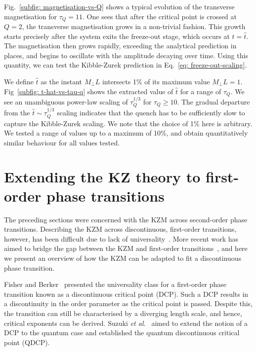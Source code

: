 Fig.~\ref{subfig: magnetisation-vs-Q} shows a typical evolution of the
transverse magnetisation for \(\tau_Q = 11\).
One sees that after the critical point is crossed at \( Q = 2 \), the transverse
magnetisation grows in a non-trivial fashion.
This growth starts precisely after the system exits the freeze-out stage, which
occurs at \(t=\hat{t}\).
The magnetisation then grows rapidly, exceeding the analytical prediction in
places, and begins to oscillate with the amplitude decaying over time.
Using this quantity, we can test the Kibble-Zurek prediction in
Eq.~\eqref{eq: freeze-out-scaling}.

We define \( \hat{t} \) as the instant \(M_\perp L\) intersects 1\% of its
maximum value \(M_\perp L = 1\).
Fig~\ref{subfig: t-hat-vs-tau-q} shows the extracted value of \( \hat{t} \) for
a range of \( \tau_Q \).
We see an unambiguous power-law scaling of \(\tau_Q^{1/3}\) for
\(\tau_Q \geq 10\).
The gradual departure from the \(\hat{t} \sim \tau_Q^{1/3}\) scaling indicates
that the quench has to be sufficiently slow to capture the Kibble-Zurek scaling.
We note that the choice of 1\% here is arbitrary.
We tested a range of values up to a maximum of 10\%, and obtain quantitatively
similar behaviour for all values tested.

\section{Extending the KZ theory to first-order phase transitions}
The preceding sections were concerned with the KZM across second-order phase
transitions.
Describing the KZM across discontinuous, first-order transitions, however, has
been difficult due to lack of
universality~\cite{Turban2002,Continentino2004,Nauenberg1975}.
More recent work has aimed to bridge the gap between the KZM and first-order
transitions~\cite{Suzuki2015}, and here we present an overview of how the KZM
can be adapted to fit a discontinuous phase transition.

Fisher and Berker~\cite{Fisher1982} presented the universality class for
a first-order phase transition known as a discontinuous critical point (DCP).
Such a DCP results in a discontinuity in the order parameter as the critical
point is passed.
Despite this, the transition can still be characterised by a diverging length
scale, and hence, critical exponents can be derived.
Suzuki \textit{et al.}~\cite{Suzuki2015} aimed to extend the notion of a DCP to
the quantum case and established the quantum discontinuous critical point
(QDCP).

